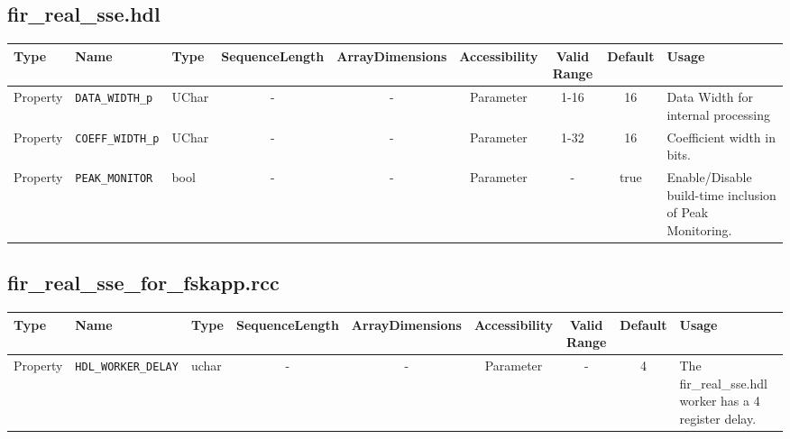\documentclass{article}
\def\comp{fir\_real\_sse}
\begin{document}
\begin{landscape}
	\subsection*{\comp.hdl}
	\begin{scriptsize}
		\begin{tabular}{|p{3cm}|p{2cm}|p{1cm}|c|c|c|c|c|p{5cm}|}
			\hline
			\rowcolor{blue}
			Type     & Name                 & Type  & SequenceLength & ArrayDimensions & Accessibility       & Valid Range & Default & Usage                                        \\
			\hline
			Property & \verb+DATA_WIDTH_p+  & UChar & -              & -               & Parameter & 1-16        & 16      & Data Width for internal processing \\
			\hline
			Property & \verb+COEFF_WIDTH_p+ & UChar & -              & -               & Parameter & 1-32        & 16      & Coefficient width in bits.                           \\
			\hline
			Property & \verb+PEAK_MONITOR+ & bool & -              & -               & Parameter &  -       & true      & Enable/Disable build-time inclusion of Peak Monitoring.                            \\
			\hline
		\end{tabular}
	\end{scriptsize}
 
 \subsection*{fir\_real\_sse\_for\_fskapp.rcc}
	\begin{scriptsize}
		\begin{tabular}{|p{3cm}|p{2cm}|p{1cm}|c|c|c|c|c|p{5cm}|}
			\hline
			\rowcolor{blue}
			Type     & Name                 & Type  & SequenceLength & ArrayDimensions & Accessibility       & Valid Range & Default & Usage                                        \\
			\hline
			Property & \verb+HDL_WORKER_DELAY+  & uchar & -              & -               & Parameter &    -   & 4      & The fir\_real\_sse.hdl worker has a 4 register delay.\\
			\hline
		\end{tabular}
	\end{scriptsize}


\end{landscape}
\end{document}
